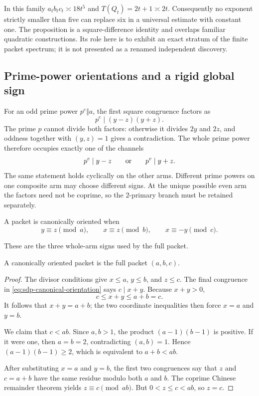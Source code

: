 In this family $a_tb_tc_t\asymp18t^5$ and $T(Q_t)=2t+1\asymp2t$.
Consequently no exponent strictly smaller than five can replace six in a
universal estimate with constant one.  The proposition is a square-difference
identity and overlaps familiar quadratic constructions.  Its role here is to
exhibit an exact stratum of the finite packet spectrum; it is not presented as
a renamed independent discovery.

\subsection{Prime-power orientations and a rigid global sign}

For an odd prime power $p^e\Vert a$, the first square congruence factors as
\[
 p^e\mid(y-z)(y+z).
\]
The prime $p$ cannot divide both factors: otherwise it divides $2y$ and
$2z$, and oddness together with $(y,z)=1$ gives a contradiction.  The whole
prime power therefore occupies exactly one of the channels
\begin{equation}
 p^e\mid y-z
 \qquad\hbox{or}\qquad
 p^e\mid y+z.
 \label{eq:sdp-orientation-channel}
\end{equation}
The same statement holds cyclically on the other arms.  Different prime
powers on one composite arm may choose different signs.  At the unique
possible even arm the factors need not be coprime, so the $2$-primary branch
must be retained separately.

\begin{definition}
\label{def:sdp-canonical-orientation}
A packet is canonically oriented when
\begin{equation}
 y\equiv z\pmod a,
 \qquad
 x\equiv z\pmod b,
 \qquad
 x\equiv-y\pmod c.
 \label{eq:sdp-canonical-orientation}
\end{equation}
\end{definition}

These are the three whole-arm signs used by the full packet.

\begin{theorem}
\label{thm:sdp-canonical-rigidity}
A canonically oriented packet is the full packet $(a,b,c)$.
\end{theorem}

\begin{proof}
The divisor conditions give $x\le a$, $y\le b$, and $z\le c$.  The final
congruence in \eqref{eq:sdp-canonical-orientation} says $c\mid x+y$.
Because $x+y>0$,
\[
 c\le x+y\le a+b=c.
\]
It follows that $x+y=a+b$; the two coordinate inequalities then force
$x=a$ and $y=b$.

We claim that $c<ab$.  Since $a,b>1$, the product
$(a-1)(b-1)$ is positive.  If it were one, then $a=b=2$, contradicting
$(a,b)=1$.  Hence $(a-1)(b-1)\ge2$, which is equivalent to $a+b<ab$.

After substituting $x=a$ and $y=b$, the first two congruences say that $z$
and $c=a+b$ have the same residue modulo both $a$ and $b$.  The coprime
Chinese remainder theorem yields $z\equiv c\pmod{ab}$.  But
$0<z\le c<ab$, so $z=c$.
\end{proof}

